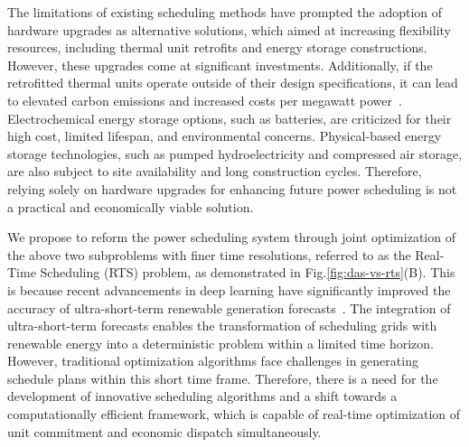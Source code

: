 The limitations of existing scheduling methods have prompted the adoption of hardware upgrades as alternative solutions, which aimed at increasing flexibility resources, including thermal unit retrofits and energy storage constructions. However, these upgrades come at significant investments. Additionally, if the retrofitted thermal units operate outside of their design specifications, it can lead to elevated carbon emissions and increased costs per megawatt power~\cite{chen2021flexible}. Electrochemical energy storage options, such as batteries, are criticized for their high cost, limited lifespan, and environmental concerns. Physical-based energy storage technologies, such as pumped hydroelectricity and compressed air storage, are also subject to site availability and long construction cycles. Therefore, relying solely on hardware upgrades for enhancing future power scheduling is not a practical and economically viable solution. 


We propose to reform the power scheduling system through joint optimization of the above two subproblems with finer time resolutions, referred to as the Real-Time Scheduling (RTS) problem, as demonstrated in Fig.\ref{fig:das-vs-rts}(B). 
This is because recent advancements in deep learning have significantly improved the accuracy of ultra-short-term renewable generation forecasts~\cite{wu2021ultra,tawn2022review}.
The integration of ultra-short-term forecasts enables the transformation of scheduling grids with renewable energy into a deterministic problem within a limited time horizon.
However, traditional optimization algorithms face challenges in generating schedule plans within this short time frame. 
Therefore, there is a need for the development of innovative scheduling algorithms and a shift towards a computationally efficient framework, which is capable of real-time optimization of unit commitment and economic dispatch simultaneously.



